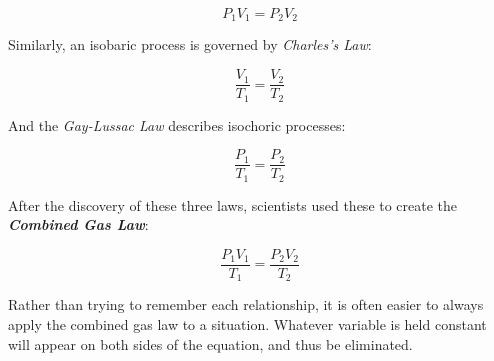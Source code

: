 	\begin{mdframed}[backgroundcolor=orange!20!white]
		\begin{equation}
			P_1 V_1 = P_2 V_2
			\label{equation:boyleslaw}
		\end{equation}
	\end{mdframed}	

Similarly, an isobaric process is governed by \textit{Charles's Law}: 
	\begin{mdframed}[backgroundcolor=orange!20!white]
	\begin{equation}
		\frac{V_1}{T_1} = \frac{V_2}{T_2}
		\label{equation:charleslaw}
	\end{equation}
\end{mdframed}	

And the \textit{Gay-Lussac Law} describes isochoric processes: 
\begin{mdframed}[backgroundcolor=orange!20!white]
	\begin{equation}
		\frac{P_1}{T_1} = \frac{P_2}{T_2}
		\label{equation:gaylussaclaw}
	\end{equation}
\end{mdframed}	

After the discovery of these three laws, scientists used these to create the \textbf{\textit{Combined Gas Law}}:  
\begin{mdframed}[backgroundcolor=orange!20!white]
	\begin{equation}
		\frac{P_1V_1}{T_1} = \frac{P_2V_2}{T_2}
		\label{equation:combinedgaslaw}
	\end{equation}
\end{mdframed}

Rather than trying to remember each relationship, it is often easier to always apply the combined gas law to a situation.  Whatever variable is held constant will appear on both sides of the equation, and thus be eliminated.  



